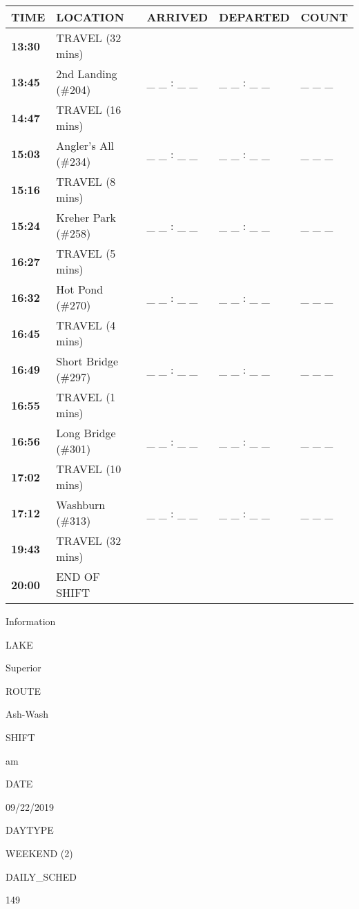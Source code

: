 \documentclass[]{article}
\begin{document}
\begin{tabular}{>{\bfseries}lllll}
\toprule
\textbf{TIME} & \textbf{LOCATION} & \textbf{ARRIVED} & \textbf{DEPARTED} & \textbf{COUNT}\\
\midrule
13:30 & TRAVEL (32 mins) &  &  & \\
13:45 & 2nd Landing (\#204) & \_ \_ : \_ \_ & \_ \_ : \_ \_ & \_ \_ \_\\
14:47 & TRAVEL (16 mins) &  &  & \\
15:03 & Angler's All (\#234) & \_ \_ : \_ \_ & \_ \_ : \_ \_ & \_ \_ \_\\
15:16 & TRAVEL (8 mins) &  &  & \\
15:24 & Kreher Park (\#258) & \_ \_ : \_ \_ & \_ \_ : \_ \_ & \_ \_ \_\\
16:27 & TRAVEL (5 mins) &  &  & \\
16:32 & Hot Pond (\#270) & \_ \_ : \_ \_ & \_ \_ : \_ \_ & \_ \_ \_\\
16:45 & TRAVEL (4 mins) &  &  & \\
16:49 & Short Bridge (\#297) & \_ \_ : \_ \_ & \_ \_ : \_ \_ & \_ \_ \_\\
16:55 & TRAVEL (1 mins) &  &  & \\
16:56 & Long Bridge (\#301) & \_ \_ : \_ \_ & \_ \_ : \_ \_ & \_ \_ \_\\
17:02 & TRAVEL (10 mins) &  &  & \\
17:12 & Washburn (\#313) & \_ \_ : \_ \_ & \_ \_ : \_ \_ & \_ \_ \_\\
19:43 & TRAVEL (32 mins) &  &  & \\
20:00 & END OF SHIFT &  &  & \\
\bottomrule
\end{tabular}\newpage

Information

LAKE

Superior

ROUTE

Ash-Wash

SHIFT

am

DATE

09/22/2019

DAYTYPE

WEEKEND (2)

DAILY\_SCHED

149

\vspace{24pt}
\end{document}
